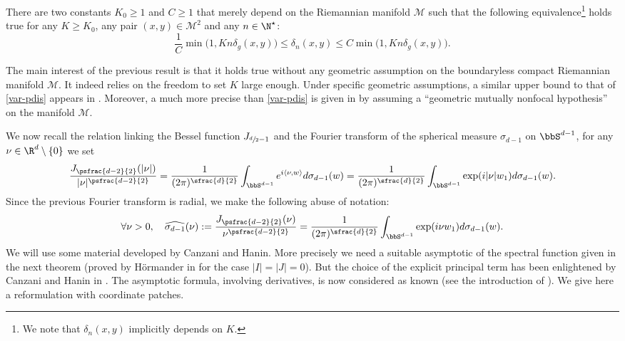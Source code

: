 \begin{theo}\label{pseudo-dis}
There are two constants $K_0\geq 1$ and $C\geq 1$ that merely depend on the Riemannian manifold $\mathcal{M}$ such that the following equivalence\footnote{We note that $\delta_n(x,y)$ implicitly depends on $K$.} holds true for any $K\geq K_0$, any pair $(x,y)\in \mathcal{M}^2$ and any $n\in \N^\star$:
\begin{equation}\label{var-pdis}
\frac{1}{C} \min\big(1,Kn\delta_g(x,y) \big)\leq \delta_n(x,y)\leq C \min\big(1,Kn\delta_g(x,y) \big).
\end{equation}
\end{theo}

The main interest of the previous result is that it holds true without any geometric assumption on the boundaryless compact Riemannian manifold $\mathcal{M}$. It indeed relies on the freedom to set $K$ large enough.
Under specific geometric assumptions, a similar upper bound to that of \eqref{var-pdis} appears in \cite[Th.\,1]{canzani2014high}. Moreover, a much more precise than \eqref{var-pdis} is given in \cite[Th.\,9]{canzani2015scaling} by assuming a ``geometric mutually nonfocal hypothesis'' on the manifold $\mathcal{M}$.

We now recall the relation linking the Bessel function $J_{\sfrac{d}{2}-1}$ and the Fourier transform of the spherical measure $\sigma_{d-1}$ on $\bbS^{d-1}$, for any $\nu\in \R^d\setminus\{0\}$ we set
\begin{equation*}
\frac{J_{\psfrac{d-2}{2}}(|\nu|)}{|\nu|^{\psfrac{d-2}{2}} }=\frac{1}{(2\pi)^{\sfrac{d}{2}}}\int_{\bbS^{d-1}}e^{i\langle \nu,w\rangle} d\sigma_{d-1}(w)=\frac{1}{(2\pi)^{\sfrac{d}{2}}}\int_{\bbS^{d-1}}\exp(i|\nu|w_1) d\sigma_{d-1}(w).
\end{equation*}
Since the previous Fourier transform is radial, we make the following abuse of notation:%
\begin{equation}\label{defi-bes}
\forall \nu>0, \quad \widehat{\sigma_{d-1}}(\nu):=\frac{J_{\psfrac{d-2}{2}}(\nu)}{\nu^{\psfrac{d-2}{2}} }=\frac{1}{(2\pi)^{\sfrac{d}{2}}}\int_{\bbS^{d-1}}\exp(i \nu w_1) d\sigma_{d-1}(w).
\end{equation}
We will use some material developed by Canzani and Hanin. More precisely we need a suitable asymptotic of the spectral function given in the next theorem (proved by Hörmander in \cite[Th.\,4.4]{horm68} for the case $|I|=|J|=0$). But the choice of the
explicit principal term has been enlightened by Canzani and Hanin in \cite{canzani2015scaling}.
The asymptotic formula, involving derivatives, is now considered as known (see the introduction of
\cite{canzani2017c}). We give here a reformulation with coordinate patches.

